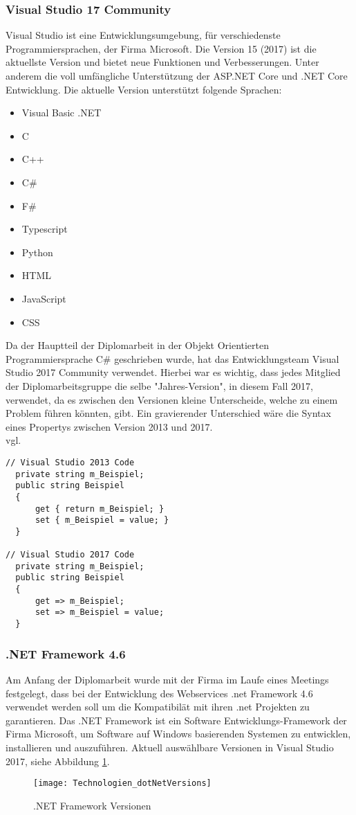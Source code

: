 \subsubsection{Visual Studio 17 Community}
\label{sec:VisualStudio17Community}
Visual Studio ist eine Entwicklungsumgebung, für verschiedenste Programmiersprachen, der Firma Microsoft. Die Version 15 (2017) ist die aktuellste Version und bietet neue Funktionen und Verbesserungen. Unter anderem die voll umfängliche Unterstützung der ASP.NET Core und .NET Core Entwicklung. Die aktuelle Version unterstützt folgende Sprachen:
\begin{itemize}
\item Visual Basic .NET
\item C
\item C++
\item C\#
\item F\#
\item Typescript
\item Python
\item HTML
\item JavaScript
\item CSS
\end{itemize}
Da der Hauptteil der Diplomarbeit in der Objekt Orientierten Programmiersprache C\# geschrieben wurde, hat das Entwicklungsteam Visual Studio 2017 Community verwendet. Hierbei war es wichtig, dass jedes Mitglied der Diplomarbeitsgruppe die selbe "Jahres-Version", in diesem Fall 2017, verwendet, da es zwischen den Versionen kleine Unterscheide, welche zu einem Problem führen könnten, gibt. Ein gravierender Unterschied wäre die Syntax eines Propertys zwischen Version 2013 und 2017. \\vgl. \cite{visualstudio}
\begin{lstlisting}[caption=Syntax Unterschied: Property , label=lst:test]
// Visual Studio 2013 Code
  private string m_Beispiel;
  public string Beispiel
  {
      get { return m_Beispiel; }
      set { m_Beispiel = value; }
  }

// Visual Studio 2017 Code
  private string m_Beispiel;
  public string Beispiel
  {
      get => m_Beispiel;
      set => m_Beispiel = value;
  }
\end{lstlisting}

\subsubsection{.NET Framework 4.6}
\label{sec:.NETFramework4.6}
Am Anfang der Diplomarbeit wurde mit der Firma im Laufe eines Meetings festgelegt, dass bei der Entwicklung des Webservices .net Framework 4.6 verwendet werden soll um die Kompatibilät mit ihren .net Projekten zu garantieren.
Das .NET Framework ist ein Software Entwicklungs-Framework der Firma Microsoft, um Software auf Windows basierenden Systemen zu entwicklen, installieren und auszuführen. 
Aktuell auswählbare Versionen in Visual Studio 2017, siehe Abbildung \ref{fig:netFramework}.\\ 
\begin{figure}[H]
	\centering
    \texttt{[image: Technologien\_dotNetVersions]}
    \caption{.NET Framework Versionen}
    \label{fig:netFramework}
\end{figure}
\justifying
